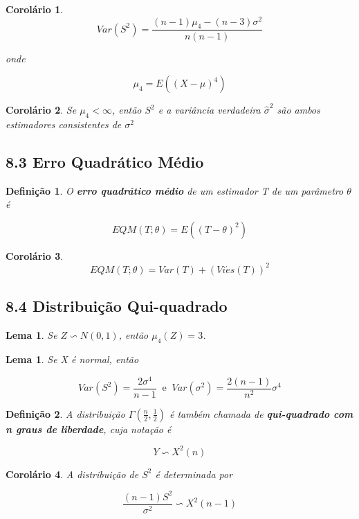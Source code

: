 \documentclass[12pt]{article}
\newtheorem{corollary}{Corolário}[theorem]
\newtheorem{lemma}[theorem]{Lema}
\newtheorem{definition}{Definição}
\begin{document}
\begin{corollary}
    $$Var(S^2) = \frac{(n-1) \mu_4 - (n-3) \sigma^2}{n (n-1)}$$
    
    onde
    
    $$\mu_4 = E((X - \mu)^4)$$
\end{corollary}

\begin{corollary}
    Se $\mu_4 < \infty$, então $S^2$ e a variância verdadeira $\hat{\sigma}^2$ são ambos estimadores consistentes de $\sigma^2$
\end{corollary}

\subsection*{8.3 Erro Quadrático Médio}
\label{s38}

\begin{definition}
    O \textbf{erro quadrático médio} de um estimador T de um parâmetro $\theta$ é
    
    $$EQM(T;\theta) = E((T - \theta)^2)$$
\end{definition}

\begin{corollary}
    $$EQM(T; \theta) = Var(T) + (Vi\acute{e}s(T))^2$$
\end{corollary}

\subsection*{8.4 Distribuição Qui-quadrado}
\label{s39}

\begin{lemma}
    Se $Z \backsim N(0, 1)$, então $\mu_4 (Z) = 3$.
\end{lemma}

\begin{lemma}
    Se X é normal, então
    
    $$Var(S^2) = \frac{2 \sigma^4}{n - 1} \ \text{ e } \ Var(\sigma^2) = \frac{2 (n-1)}{n^2}\sigma^4$$
\end{lemma}

\begin{definition}
    A distribuição $\Gamma(\frac{n}{2}, \frac{1}{2})$ é também chamada de \textbf{qui-quadrado com n graus de liberdade}, cuja notação é
    
    $$Y \backsim X^2(n)$$
\end{definition}

\begin{corollary}
    A distribuição de $S^2$ é determinada por
    
    $$\frac{(n-1) S^2}{\sigma^2} \backsim X^2 (n-1)$$
\end{corollary}
\end{document}
